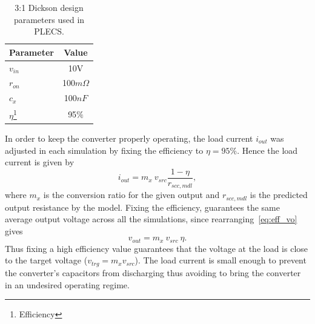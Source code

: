 \begin{table}[h]
\centering
\caption{3:1 Dickson design parameters used in PLECS.}
\label{tab:sim_values}
\renewcommand{\arraystretch}{1.5}%
\begin{tabular}{l | c  }
 Parameter  &  Value  \\
 \midrule
 $v_{in}$   & 10V \\
 $r_{on}$   & 100$m\Omega$ \\
 $c_x$      & 100$nF$\\
 $\eta$\footnote{Efficiency} & 95$\%$
\end{tabular}
\end{table}

In order to keep the converter properly operating, the load current $i_{out}$ was adjusted in each simulation by fixing the efficiency to $\eta=95\%$. Hence the load current is given by
\begin{equation}
    i_{out}=m_x~v_{src}\frac{1-\eta}{r_{scc,mdl}},
\label{eq:iout_eff}
\end{equation}
where $m_x$ is the conversion ratio for the given output and $r_{scc,mdl}$ is the predicted output resistance by the model. Fixing the efficiency, guarantees the same average output voltage across all the simulations, since rearranging~\eqref{eq:eff_vo} gives
\begin{equation}
    v_{out}=m_x~v_{src}~\eta.
\label{eq:vout_eff}
\end{equation}
Thus fixing a high efficiency value guarantees that the voltage at the load is close to the target voltage ($v_{trg}=m_x v_{src}$). The load current is small enough to prevent the converter's capacitors from discharging thus avoiding to bring the converter in an undesired operating regime.

